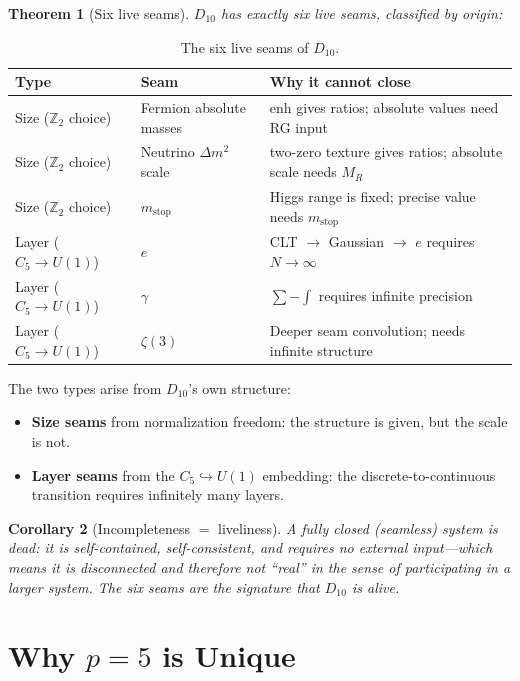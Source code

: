 \documentclass[11pt,a4paper]{article}
\newtheorem{theorem}{Theorem}
\newtheorem{corollary}[theorem]{Corollary}
\begin{document}
\begin{theorem}[Six live seams]
$D_{10}$ has exactly six live seams, classified by origin:
\end{theorem}

\begin{table}[h]
\centering
\begin{tabular}{llp{6cm}}
\toprule
Type & Seam & Why it cannot close \\
\midrule
Size ($\mathbb{Z}_2$ choice) & Fermion absolute masses & enh gives ratios; absolute values need RG input \\
Size ($\mathbb{Z}_2$ choice) & Neutrino $\Delta m^2$ scale & two-zero texture gives ratios; absolute scale needs $M_R$ \\
Size ($\mathbb{Z}_2$ choice) & $m_{\text{stop}}$ & Higgs range is fixed; precise value needs $m_{\text{stop}}$ \\
\midrule
Layer ($C_5 \to U(1)$) & $e$ & CLT $\to$ Gaussian $\to$ $e$ requires $N \to \infty$ \\
Layer ($C_5 \to U(1)$) & $\gamma$ & $\sum - \int$ requires infinite precision \\
Layer ($C_5 \to U(1)$) & $\zeta(3)$ & Deeper seam convolution; needs infinite structure \\
\bottomrule
\end{tabular}
\caption{The six live seams of $D_{10}$.}
\end{table}

The two types arise from $D_{10}$'s own structure:
\begin{itemize}
\item \textbf{Size seams} from normalization freedom: the structure is given, but the scale is not.
\item \textbf{Layer seams} from the $C_5 \hookrightarrow U(1)$ embedding: the discrete-to-continuous transition requires infinitely many layers.
\end{itemize}

\begin{corollary}[Incompleteness $=$ liveliness]
A fully closed (seamless) system is dead: it is self-contained, self-consistent, and requires no external input---which means it is disconnected and therefore not ``real'' in the sense of participating in a larger system. The six seams are the signature that $D_{10}$ is alive.
\end{corollary}

\section{Why $p = 5$ is Unique}
\label{sec:uniqueness}
\end{document}
